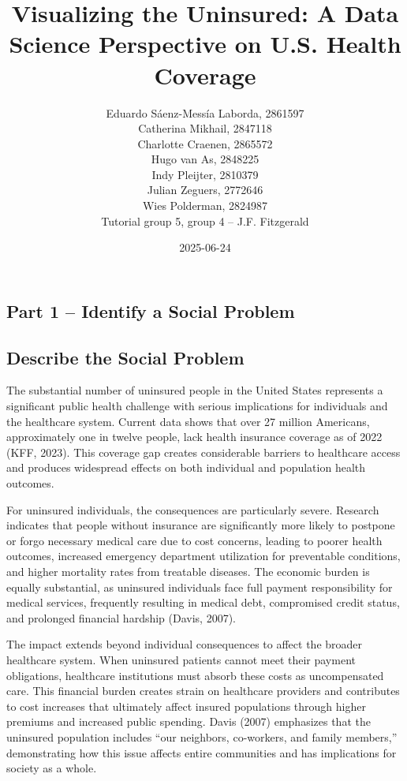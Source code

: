 \documentclass[
]{article}
\title{Visualizing the Uninsured: A Data Science Perspective on U.S.
Health Coverage}
\author{Eduardo Sáenz-Messía Laborda, 2861597\\
Catherina Mikhail, 2847118\\
Charlotte Craenen, 2865572\\
Hugo van As, 2848225\\
Indy Pleijter, 2810379\\
Julian Zeguers, 2772646\\
Wies Polderman, 2824987\\
Tutorial group 5, group 4 -- J.F. Fitzgerald}
\date{2025-06-24}
\begin{document}
\maketitle

{
\setcounter{tocdepth}{2}
\tableofcontents
}
\subsection{\texorpdfstring{\textbf{Part 1 -- Identify a Social
Problem}}{Part 1 -- Identify a Social Problem}}\label{part-1-identify-a-social-problem}

\subsection{Describe the Social
Problem}\label{describe-the-social-problem}

The substantial number of uninsured people in the United States
represents a significant public health challenge with serious
implications for individuals and the healthcare system. Current data
shows that over 27 million Americans, approximately one in twelve
people, lack health insurance coverage as of 2022 (KFF, 2023). This
coverage gap creates considerable barriers to healthcare access and
produces widespread effects on both individual and population health
outcomes.

For uninsured individuals, the consequences are particularly severe.
Research indicates that people without insurance are significantly more
likely to postpone or forgo necessary medical care due to cost concerns,
leading to poorer health outcomes, increased emergency department
utilization for preventable conditions, and higher mortality rates from
treatable diseases. The economic burden is equally substantial, as
uninsured individuals face full payment responsibility for medical
services, frequently resulting in medical debt, compromised credit
status, and prolonged financial hardship (Davis, 2007).

The impact extends beyond individual consequences to affect the broader
healthcare system. When uninsured patients cannot meet their payment
obligations, healthcare institutions must absorb these costs as
uncompensated care. This financial burden creates strain on healthcare
providers and contributes to cost increases that ultimately affect
insured populations through higher premiums and increased public
spending. Davis (2007) emphasizes that the uninsured population includes
``our neighbors, co-workers, and family members,'' demonstrating how
this issue affects entire communities and has implications for society
as a whole.
\end{document}
